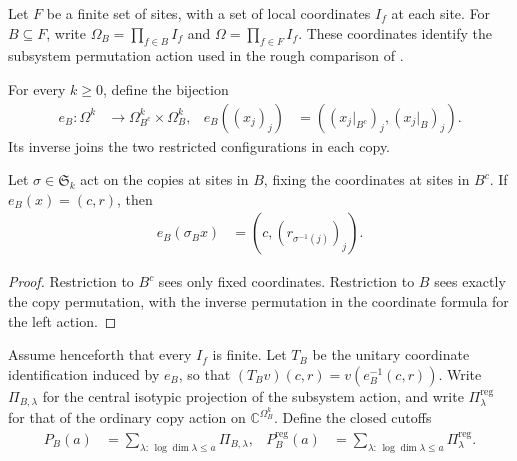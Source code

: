 Let $F$ be a finite set of sites, with a set of local coordinates $I_f$ at
each site. For $B\subseteq F$, write
$\Omega_B=\prod_{f\in B}I_f$ and $\Omega=\prod_{f\in F}I_f$.
These coordinates identify the subsystem permutation action used in the
rough comparison of \cite[Section~7]{OpenAI2026AreaLaw}.

\begin{definition}
\label{def:subsystem_split_coordinates}
    \leanok
For every $k\ge0$, define the bijection
\begin{align}
 e_B:\Omega^k&\longrightarrow\Omega_{B^c}^k\times\Omega_B^k,
 & e_B((x_j)_j)&=((x_j|_{B^c})_j,(x_j|_B)_j).
\end{align}
Its inverse joins the two restricted configurations in each copy.
\end{definition}

\begin{theorem}
\label{thm:subsystem_split_permutation}
    \leanok
{}
Let $\sigma\in\mathfrak S_k$ act on the copies at sites in $B$, fixing
the coordinates at sites in $B^c$. If $e_B(x)=(c,r)$, then
\begin{align}
 e_B(\sigma_B x)&=(c,(r_{\sigma^{-1}(j)})_j).
\end{align}
\end{theorem}
\begin{proof}
    \leanok
Restriction to $B^c$ sees only fixed coordinates. Restriction to $B$ sees
exactly the copy permutation, with the inverse permutation in the
coordinate formula for the left action.
\end{proof}

Assume henceforth that every $I_f$ is finite. Let $T_B$ be the unitary
coordinate identification induced by $e_B$, so that
$(T_Bv)(c,r)=v(e_B^{-1}(c,r))$. Write $\Pi_{B,\lambda}$ for the central
isotypic projection of the subsystem action, and write
$\Pi^{\mathrm{reg}}_\lambda$ for that of the ordinary copy action on
$\mathbb C^{\Omega_B^k}$. Define the closed cutoffs
\begin{align}
 P_B(a)&=\sum_{\lambda:\,\log\dim\lambda\le a}\Pi_{B,\lambda},
 &P^{\mathrm{reg}}_B(a)
 &=\sum_{\lambda:\,\log\dim\lambda\le a}\Pi^{\mathrm{reg}}_\lambda.
\end{align}

